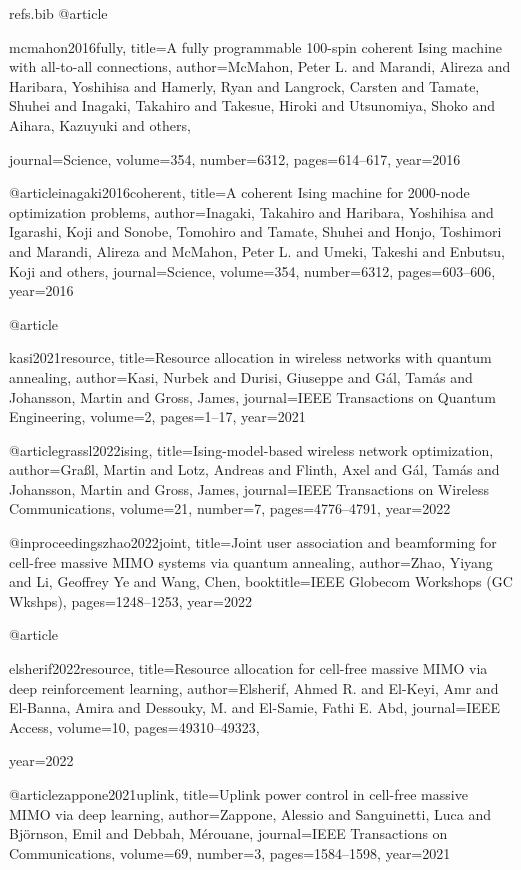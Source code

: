 {\begin{filecontents*}{refs.bib}
@article{mcmahon2016fully,
  title={A fully programmable 100-spin coherent Ising machine with all-to-all connections},
  author={McMahon, Peter L. and Marandi, Alireza and Haribara, Yoshihisa and Hamerly, Ryan and Langrock, Carsten and Tamate, Shuhei and Inagaki, Takahiro and Takesue, Hiroki and Utsunomiya, Shoko and Aihara, Kazuyuki and others},

  journal={Science},
  volume={354},
  number={6312},
  pages={614--617},
  year={2016}
}

@article{inagaki2016coherent,
  title={A coherent Ising machine for 2000-node optimization problems},
  author={Inagaki, Takahiro and Haribara, Yoshihisa and Igarashi, Koji and Sonobe, Tomohiro and Tamate, Shuhei and Honjo, Toshimori and Marandi, Alireza and McMahon, Peter L. and Umeki, Takeshi and Enbutsu, Koji and others},
  journal={Science},
  volume={354},
  number={6312},
  pages={603--606},
  year={2016}
}

@article{kasi2021resource,
  title={Resource allocation in wireless networks with quantum annealing},
  author={Kasi, Nurbek and Durisi, Giuseppe and G{\'a}l, Tam{\'a}s and Johansson, Martin and Gross, James},
  journal={IEEE Transactions on Quantum Engineering},
  volume={2},
  pages={1--17},
  year={2021}

}

@article{grassl2022ising,
  title={Ising-model-based wireless network optimization},
  author={Gra{\ss}l, Martin and Lotz, Andreas and Flinth, Axel and G{\'a}l, Tam{\'a}s and Johansson, Martin and Gross, James},
  journal={IEEE Transactions on Wireless Communications},
  volume={21},
  number={7},
  pages={4776--4791},
  year={2022}
}

@inproceedings{zhao2022joint,
  title={Joint user association and beamforming for cell-free massive MIMO systems via quantum annealing},
  author={Zhao, Yiyang and Li, Geoffrey Ye and Wang, Chen},
  booktitle={IEEE Globecom Workshops (GC Wkshps)},
  pages={1248--1253},
  year={2022}
}

@article{elsherif2022resource,
  title={Resource allocation for cell-free massive MIMO via deep reinforcement learning},
  author={Elsherif, Ahmed R. and El-Keyi, Amr and El-Banna, Amira and Dessouky, M. and El-Samie, Fathi E. Abd},
  journal={IEEE Access},
  volume={10},
  pages={49310--49323},

  year={2022}
}

@article{zappone2021uplink,
  title={Uplink power control in cell-free massive MIMO via deep learning},
  author={Zappone, Alessio and Sanguinetti, Luca and Bj\"ornson, Emil and Debbah, M{\'e}rouane},
  journal={IEEE Transactions on Communications},
  volume={69},
  number={3},
  pages={1584--1598},
  year={2021}
}


\end{filecontents*}}
